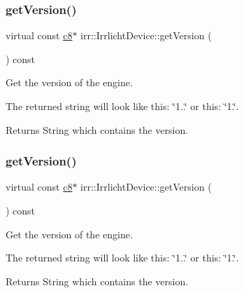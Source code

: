 \subsubsection{\texorpdfstring{get\+Version()}{getVersion()}\hspace{0.1cm}{\footnotesize\ttfamily [1/3]}}
{\footnotesize\ttfamily virtual const \hyperlink{namespaceirr_a9395eaea339bcb546b319e9c96bf7410}{c8}$\ast$ irr\+::\+Irrlicht\+Device\+::get\+Version (\begin{DoxyParamCaption}{ }\end{DoxyParamCaption}) const\hspace{0.3cm}{\ttfamily [pure virtual]}}



Get the version of the engine. 

The returned string will look like this\+: \char`\"{}1..\char`\"{} or this\+: \char`\"{}1.\char`\"{}. \begin{DoxyReturn}{Returns}
String which contains the version. 
\end{DoxyReturn}
\mbox{\label{classirr_1_1IrrlichtDevice_a4eb5bc1b15f552ce2c37d792231392f7}} 
\subsubsection{\texorpdfstring{get\+Version()}{getVersion()}\hspace{0.1cm}{\footnotesize\ttfamily [2/3]}}
{\footnotesize\ttfamily virtual const \hyperlink{namespaceirr_a9395eaea339bcb546b319e9c96bf7410}{c8}$\ast$ irr\+::\+Irrlicht\+Device\+::get\+Version (\begin{DoxyParamCaption}{ }\end{DoxyParamCaption}) const\hspace{0.3cm}{\ttfamily [pure virtual]}}



Get the version of the engine. 

The returned string will look like this\+: \char`\"{}1..\char`\"{} or this\+: \char`\"{}1.\char`\"{}. \begin{DoxyReturn}{Returns}
String which contains the version. 
\end{DoxyReturn}
\mbox{\label{classirr_1_1IrrlichtDevice_a4eb5bc1b15f552ce2c37d792231392f7}} 
